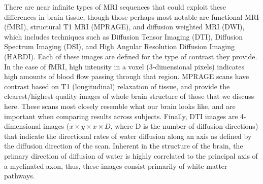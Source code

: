 There are near infinite types of MRI sequences that could exploit these differences in brain tissue, though those perhaps most notable are functional MRI (fMRI), structural T1 MRI (MPRAGE), and diffusion weighted MRI (DWI), which includes techniques such as Diffusion Tensor Imaging (DTI), Diffusion Spectrum Imaging (DSI), and High Angular Resolution Diffusion Imaging (HARDI). Each of these images are defined for the type of contrast they provide. In the case of fMRI, high intensity in a voxel (3-dimensional pixels) indicates high amounts of blood flow passing through that region. MPRAGE scans have contrast based on T1 (longitudinal) relaxation of tissue, and provide the clearest/highest quality images of whole brain structure of those that we discuss here. These scans most closely resemble what our brain looks like, and are important when comparing results across subjects. Finally, DTI images are 4-dimensional images ($x \times y \times x \times D$, where D is the number of diffusion directions) that indicate the directional rates of water diffusion along an axis as defined by the diffusion direction of the scan. Inherent in the structure of the brain, the primary direction of diffusion of water is highly correlated to the principal axis of a myelinated axon, thus, these images consist primarily of white matter pathways.


